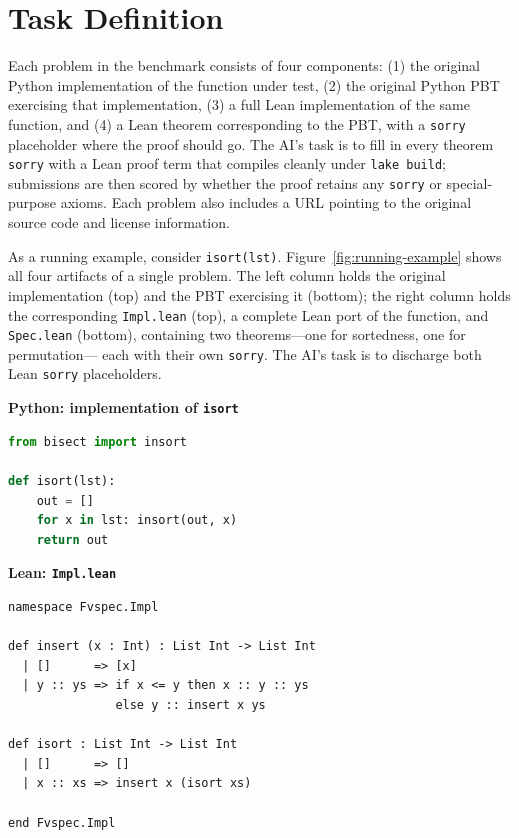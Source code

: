 \section{Task Definition}

Each problem in the \FVSpec benchmark consists of four components: (1) the original Python implementation of the function under test, (2) the original Python PBT exercising that implementation, (3) a full Lean implementation of the same function, and (4) a Lean theorem corresponding to the PBT, with a \texttt{sorry} placeholder where the proof should go. The AI's task is to fill in every theorem \texttt{sorry} with a Lean proof term that compiles cleanly under \texttt{lake build}; submissions are then scored by whether the proof retains any \texttt{sorry} or special-purpose axioms. Each problem also includes a URL pointing to the original source code and license information.

As a running example, consider \texttt{isort(lst)}. Figure~\ref{fig:running-example}
shows all four artifacts of a single \FVSpec problem. The left column holds
the original implementation (top) and the PBT exercising it
(bottom); the right column holds the corresponding \texttt{Impl.lean}
(top), a complete Lean port of the function, and \texttt{Spec.lean}
(bottom), containing two theorems---one for sortedness, one for permutation---
each with their own \texttt{sorry}. The AI's task is to discharge both
Lean \texttt{sorry} placeholders.

\begin{lrbox}{\fvspecPyImplBox}%
\begin{minipage}{0.36\linewidth}
{\small\sffamily\textbf{Python: implementation of \texttt{isort}}}\par\smallskip
\begin{lstlisting}[style=code, language=Python, basicstyle=\ttfamily\scriptsize]
from bisect import insort

def isort(lst):
    out = []
    for x in lst: insort(out, x)
    return out
\end{lstlisting}
\end{minipage}%
\end{lrbox}%

\begin{lrbox}{\fvspecImplBox}%
\begin{minipage}{0.46\linewidth}
{\small\sffamily\textbf{Lean: \texttt{Impl.lean}}}\par\smallskip
\begin{lstlisting}[style=code, language=Lean, basicstyle=\ttfamily\scriptsize]
namespace Fvspec.Impl

def insert (x : Int) : List Int -> List Int
  | []      => [x]
  | y :: ys => if x <= y then x :: y :: ys
               else y :: insert x ys

def isort : List Int -> List Int
  | []      => []
  | x :: xs => insert x (isort xs)

end Fvspec.Impl
\end{lstlisting}
\end{minipage}%
\end{lrbox}%

